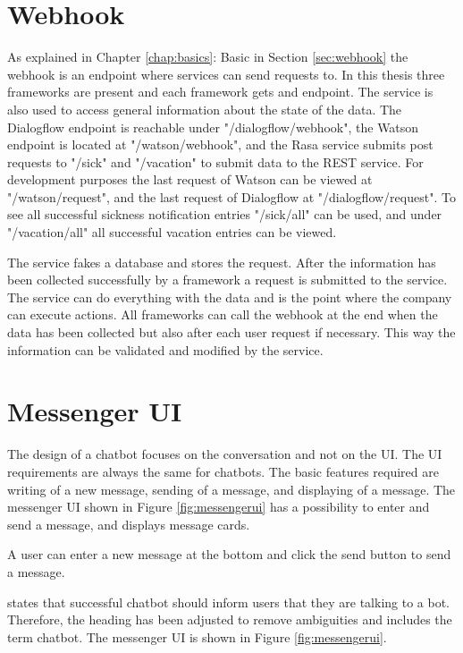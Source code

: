 \section{Webhook}
As explained in Chapter \ref{chap:basics}: Basic in Section \ref{sec:webhook} 
the webhook is an endpoint where services can send requests to.
In this thesis three frameworks are present and each framework gets and endpoint.
The service is also used to access general information about the state of the data.
The Dialogflow endpoint is reachable under "/dialogflow/webhook",
the Watson endpoint is located at "/watson/webhook",
and the Rasa service submits post requests to "/sick" and "/vacation" to submit data 
to the REST service.
For development purposes the last request of Watson can be viewed at "/watson/request",
and the last request of Dialogflow at "/dialogflow/request".
To see all successful sickness notification entries "/sick/all" can be used,
and under "/vacation/all" all successful vacation entries can be viewed.

The service fakes a database and stores the request.
After the information has been collected successfully by a framework a 
request is submitted to the service.
The service can do everything with the data and is the point where the company can execute actions.
All frameworks can call the webhook at the end when the data has been collected but also 
after each user request if necessary.
This way the information can be validated and modified by the service.



\section{Messenger UI}
The design of a chatbot focuses on the conversation and not on the UI.
The UI requirements are always the same for chatbots.
The basic features required are writing of a new message, sending of a message, and displaying of a message.
The messenger UI shown in Figure \ref{fig:messengerui} has a possibility to enter and send 
a message, and displays message cards.

A user can enter a new message at the bottom and click the send button to send a message.


\citet{brandtzaeg2018chatbots} states that successful chatbot should inform users that they are talking to a bot.
Therefore, the heading has been adjusted to remove ambiguities and includes the term chatbot.
The messenger UI is shown in Figure \ref{fig:messengerui}. 


